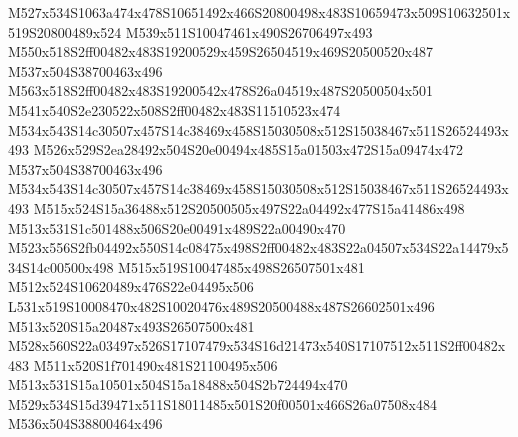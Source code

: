 \documentclass{article}
\begin{document}
\begin{multicols}{5}
\begin{center}
M527x534S1063a474x478S10651492x466S20800498x483S10659473x509S10632501x519S20800489x524 %
M539x511S10047461x490S26706497x493 %
M550x518S2ff00482x483S19200529x459S26504519x469S20500520x487 %
M537x504S38700463x496 %
M563x518S2ff00482x483S19200542x478S26a04519x487S20500504x501 %
M541x540S2e230522x508S2ff00482x483S11510523x474 %
M534x543S14c30507x457S14c38469x458S15030508x512S15038467x511S26524493x493 %
M526x529S2ea28492x504S20e00494x485S15a01503x472S15a09474x472 %
M537x504S38700463x496 %
M534x543S14c30507x457S14c38469x458S15030508x512S15038467x511S26524493x493 %
M515x524S15a36488x512S20500505x497S22a04492x477S15a41486x498 %
M513x531S1c501488x506S20e00491x489S22a00490x470 %
M523x556S2fb04492x550S14c08475x498S2ff00482x483S22a04507x534S22a14479x534S14c00500x498 %
M515x519S10047485x498S26507501x481 %
M512x524S10620489x476S22e04495x506 %
L531x519S10008470x482S10020476x489S20500488x487S26602501x496 %
M513x520S15a20487x493S26507500x481 %
M528x560S22a03497x526S17107479x534S16d21473x540S17107512x511S2ff00482x483 %
M511x520S1f701490x481S21100495x506 %
M513x531S15a10501x504S15a18488x504S2b724494x470 %
M529x534S15d39471x511S18011485x501S20f00501x466S26a07508x484 %
M536x504S38800464x496 %

\end{center}
\end{multicols}
\end{document}
